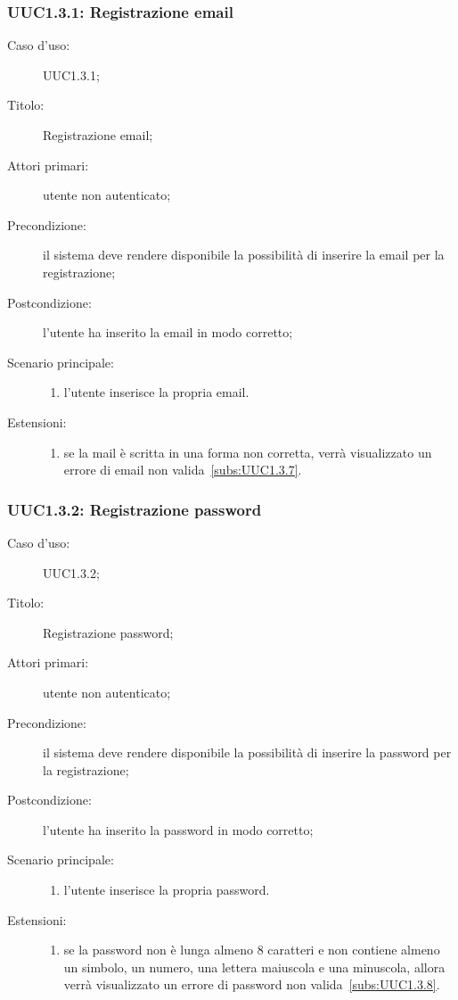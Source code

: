 \documentclass[../../../analisi-dei-requisiti.tex]{subfiles}
\begin{document}
\subsubsection{UUC1.3.1: Registrazione email}%
\label{subs:UUC1.3.1}
\begin{description}
  \item[Caso d'uso:] UUC1.3.1;
  \item[Titolo:] Registrazione email;
  \item[Attori primari:] utente non autenticato;
  \item[Precondizione:] il sistema deve rendere disponibile la possibilità di inserire la email per la registrazione;
  \item[Postcondizione:] l'utente ha inserito la email in modo corretto;
  \item[Scenario principale:]
        \begin{enumerate}
          \item l'utente inserisce la propria email.
        \end{enumerate}
  \item[Estensioni:]
        \begin{enumerate}
          \item se la mail è scritta in una forma non corretta, verrà visualizzato un errore di email non valida~\ref{subs:UUC1.3.7}.
        \end{enumerate}
\end{description}



\subsubsection{UUC1.3.2: Registrazione password}%
\label{subs:UUC1.3.2}
\begin{description}
  \item[Caso d'uso:] UUC1.3.2;
  \item[Titolo:] Registrazione password;
  \item[Attori primari:] utente non autenticato;
  \item[Precondizione:] il sistema deve rendere disponibile la possibilità di inserire la password per la registrazione;
  \item[Postcondizione:] l'utente ha inserito la password in modo corretto;
  \item[Scenario principale:]
        \begin{enumerate}
          \item l'utente inserisce la propria password.
        \end{enumerate}
  \item[Estensioni:]
        \begin{enumerate}
          \item se la password non è lunga almeno 8 caratteri e non contiene almeno un simbolo, un numero, una lettera maiuscola e una minuscola, allora verrà visualizzato un errore di password non valida~\ref{subs:UUC1.3.8}.
        \end{enumerate}
\end{description}
\end{document}
